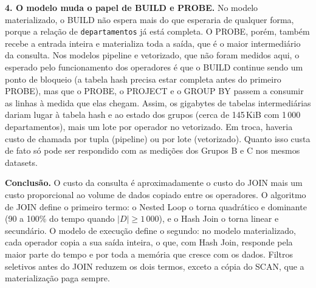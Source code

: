 \documentclass[11pt,a4paper]{article}
\begin{document}
\textbf{4. O modelo muda o papel de BUILD e PROBE.} No modelo materializado, o BUILD não espera mais do que esperaria de qualquer forma, porque a relação de \texttt{departamentos} já está completa. O PROBE, porém, também recebe a entrada inteira e materializa toda a saída, que é o maior intermediário da consulta. Nos modelos pipeline e vetorizado, que não foram medidos aqui, o esperado pelo funcionamento dos operadores é que o BUILD continue sendo um ponto de bloqueio (a tabela hash precisa estar completa antes do primeiro PROBE), mas que o PROBE, o PROJECT e o GROUP BY passem a consumir as linhas à medida que elas chegam. Assim, os gigabytes de tabelas intermediárias dariam lugar à tabela hash e ao estado dos grupos (cerca de 145\,KiB com 1\,000 departamentos), mais um lote por operador no vetorizado. Em troca, haveria custo de chamada por tupla (pipeline) ou por lote (vetorizado). Quanto isso custa de fato só pode ser respondido com as medições dos Grupos B e C nos mesmos datasets.

\textbf{Conclusão.} O custo da consulta é aproximadamente o custo do JOIN mais um custo proporcional ao volume de dados copiado entre os operadores. O algoritmo de JOIN define o primeiro termo: o Nested Loop o torna quadrático e dominante (90 a 100\% do tempo quando $|D| \geq 1\,000$), e o Hash Join o torna linear e secundário. O modelo de execução define o segundo: no modelo materializado, cada operador copia a sua saída inteira, o que, com Hash Join, responde pela maior parte do tempo e por toda a memória que cresce com os dados. Filtros seletivos antes do JOIN reduzem os dois termos, exceto a cópia do SCAN, que a materialização paga sempre.
\end{document}
